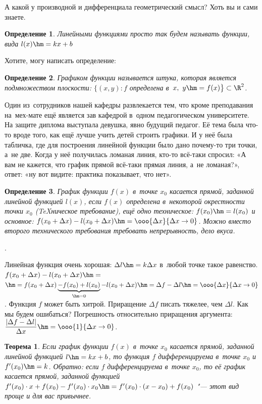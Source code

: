 \documentclass[a4paper,10pt,twoside]{article}
\newtheorem{Def}{Определение}[section]
\newtheorem{The}{Теорема}[section]
\begin{document}
А какой у производной и дифференциала геометрический смысл? Хоть вы и сами знаете.

\begin{Def}
    Линейными функциями просто так будем называть функции, вида $l(x)\hm=kx+b$
\end{Def}

Хотите, могу написать определение:

\begin{Def}
Графиком функции называется штука, которая является подмножеством плоскости: $\big\{(x,y)\colon f$ определена в~$x,\ y\hm=f(x)\big\}\subset \R^2$.
\end{Def}

Один из~сотрудников нашей кафедры развлекается тем, что кроме преподавания на~мех-мате ещё является зав кафедрой в~одном педагогическом университете.
На защите диплома выступала девушка, явно будущий педагог. Её тема была что-то вроде того, как ещё лучше учить детей строить графики. И у неё была
табличка, где для построения линейной функции было дано почему-то три точки, а~не две. Когда у неё получилась ломаная линия, кто-то всё-таки
спросил: «А вам не кажется, что график прямой всё-таки прямая линия, а~не ломаная?», ответ: «ну вот видите: практика показывает, что нет».

\begin{Def}
    График функции $f(x)$ в~точке $x_0$ касается прямой, заданной линейной функцией $l(x)$, если $f(x)$ определена в~некоторой окрестности
    точки $x_0$ (\TeX{ническое} требование), ещё одно техническое: $f(x_0)\hm=l(x_0)$ и основное:
    $f(x_0+\Delta x)-l(x_0+\Delta x)\hm=\ooo{\Delta x}{\Delta x\to0}$. Можно вместо второго технического требования требовать непрерывность, дело вкуса.
\end{Def}

.

Линейная функция очень хорошая: $\Delta l\hm=k\Delta x$ в~любой точке такое равенство. $f(x_0+\Delta x)-l(x_0+\Delta x)\hm=$
$\hm=f(x_0+\Delta x)\underbrace{-f(x_0)+l(x_0)}_{\hm=0}-l(x_0+\Delta x)\hm=\Delta f-\Delta l\hm=\ooo{\Delta x}{\Delta x\to0}$.
Функция $f$ может быть хитрой. Приращение $\Delta f$ писать тяжелее, чем $\Delta l$. Как мы будем ошибаться? Погрешность относительно приращения аргумента: $\dfrac{|\Delta f-\Delta l|}{\Delta x}\hm=\ooo{1}{\Delta x\to 0}$.

\begin{The}
    Если график функции $f(x)$ в~точке $x_0$ касается прямой, заданной линейной функцией $l\hm=kx+b$,
     то функция $f$ дифференцируема в~точке $x_0$ и $f'(x_0)\hm=k$. Обратно: если $f$ дифференцируема в~точке $x_0$,
     то её график касается прямой, заданной функцией $f'(x_0)\cdot x+f(x_0)-f'(x_0)\cdot x_0\hm=f'(x_0)\cdot(x-x_0)+f(x_0)$ "--- этот вид проще и для вас привычнее.
\end{The}
\end{document}
